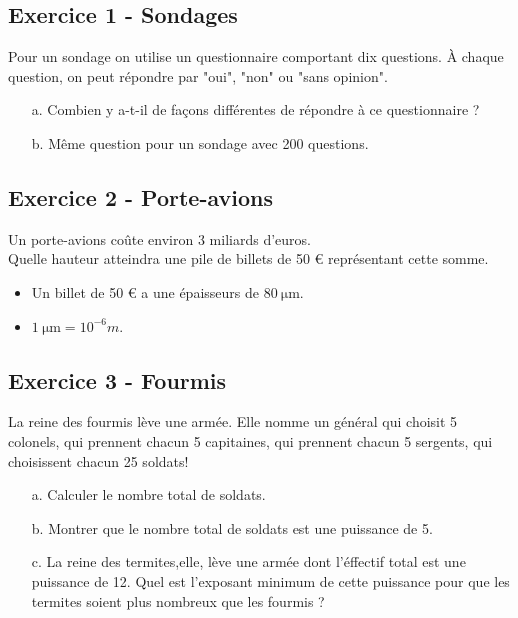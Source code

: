 \documentclass[10pt]{article}
\begin{document}
\subsection*{Exercice 1 - Sondages} 

Pour un sondage on utilise un questionnaire comportant dix questions. À chaque question, on peut répondre par "oui", "non" ou "sans opinion".

\begin{enumerate}
\item[a.] Combien y a-t-il de façons différentes de répondre à ce questionnaire ? 
\item[b.] Même question pour un sondage avec 200 questions. 
\end{enumerate}

\subsection*{Exercice 2 - Porte-avions} 

Un porte-avions coûte environ 3 miliards d'euros. \\
Quelle hauteur atteindra une pile de billets de 50 \euro \: représentant cette somme.

\begin{itemize}
\item Un billet de 50 \euro \: a une épaisseurs de $\SI{80}{\micro\meter}$. 
\item $\SI{1}{\micro \meter} = 10^{-6}m$.
\end{itemize}

\subsection*{Exercice 3 - Fourmis}

La reine des fourmis lève une armée. Elle nomme un général qui choisit 5 colonels, qui prennent chacun 5 capitaines, qui prennent chacun 5 sergents, qui choisissent chacun 25 soldats!
\begin{enumerate}
\item[a.] Calculer le nombre total de soldats.
\item[b.] Montrer que le nombre total de soldats est une puissance de 5.
\item[c.] La reine des termites,elle, lève une armée dont l'éffectif total est une puissance de 12. 
Quel est l'exposant minimum de cette puissance pour que les termites soient plus nombreux que les fourmis ?
\end{enumerate}
\end{document}
